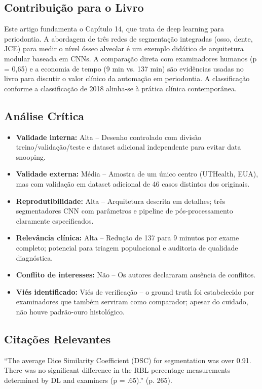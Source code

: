 \subsection{Contribuição para o Livro}
Este artigo fundamenta o Capítulo 14, que trata de deep learning para
periodontia. A abordagem de três redes de segmentação integradas (osso, dente,
JCE) para medir o nível ósseo alveolar é um exemplo didático de arquitetura
modular baseada em CNNs. A comparação direta com examinadores humanos (p = 0,65)
e a economia de tempo (9 min vs. 137 min) são evidências usadas no livro para
discutir o valor clínico da automação em periodontia. A classificação conforme
a classificação de 2018 alinha-se à prática clínica contemporânea.

\subsection{Análise Crítica}
\begin{itemize}
  \item \textbf{Validade interna:} Alta -- Desenho controlado com divisão
        treino/validação/teste e dataset adicional independente para evitar
        data snooping.
  \item \textbf{Validade externa:} Média -- Amostra de um único centro
        (UTHealth, EUA), mas com validação em dataset adicional de 46 casos
        distintos dos originais.
  \item \textbf{Reprodutibilidade:} Alta -- Arquitetura descrita em detalhes;
        três segmentadores CNN com parâmetros e pipeline de pós-processamento
        claramente especificados.
  \item \textbf{Relevância clínica:} Alta -- Redução de 137 para 9 minutos por
        exame completo; potencial para triagem populacional e auditoria de
        qualidade diagnóstica.
  \item \textbf{Conflito de interesses:} Não -- Os autores declararam ausência de
        conflitos.
  \item \textbf{Viés identificado:} Viés de verificação -- o ground truth foi
        estabelecido por examinadores que também serviram como comparador;
        apesar do cuidado, não houve padrão-ouro histológico.
\end{itemize}

\subsection{Citações Relevantes}
\begin{citacao}
``The average Dice Similarity Coefficient (DSC) for segmentation was over 0.91.
There was no significant difference in the RBL percentage measurements determined
by DL and examiners (p = .65).'' (p. 265).
\end{citacao}

